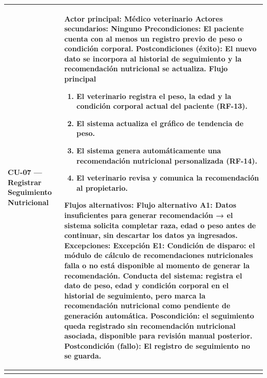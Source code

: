 \documentclass[
]{article}
\newcounter{none} %
\begin{document}
{\def\LTcaptype{none} %
\begin{longtable}[]{|
  >{\raggedright\arraybackslash}p{}|
  >{\raggedright\arraybackslash}p{}|}
\hline
\begin{minipage}[b]{\linewidth}\raggedright
\textbf{CU-07 --- Registrar Seguimiento Nutricional}
\end{minipage} & \begin{minipage}[b]{\linewidth}\raggedright
\textbf{Actor principal:} Médico veterinario \textbf{Actores
secundarios:} Ninguno \textbf{Precondiciones:} El paciente cuenta con al
menos un registro previo de peso o condición corporal. \textbf{Postcondiciones (éxito):} El nuevo dato se incorpora al
historial de seguimiento y la recomendación nutricional se actualiza. \textbf{Flujo principal}

\begin{enumerate}
\def\labelenumi{\arabic{enumi}.}
\item
  El veterinario registra el peso, la edad y la condición corporal
  actual del paciente (RF-13).
\item
  El sistema actualiza el gráfico de tendencia de peso.
\item
  El sistema genera automáticamente una recomendación nutricional
  personalizada (RF-14).
\item
  El veterinario revisa y comunica la recomendación al propietario.
\end{enumerate}

\textbf{Flujos alternativos:} Flujo alternativo A1: Datos insuficientes para generar recomendación → el sistema solicita completar raza, edad o peso antes de continuar, sin descartar los datos ya ingresados.
\textbf{Excepciones:} Excepción E1: Condición de disparo: el módulo de cálculo de recomendaciones nutricionales falla o no está disponible al momento de generar la recomendación. Conducta del sistema: registra el dato de peso, edad y condición corporal en el historial de seguimiento, pero marca la recomendación nutricional como pendiente de generación automática. Poscondición: el seguimiento queda registrado sin recomendación nutricional asociada, disponible para revisión manual posterior.
\textbf{Postcondición (fallo):} El registro de seguimiento no se guarda.
\end{minipage} \\
\hline
\endhead
\hline
\endlastfoot
\end{longtable}
}
\end{document}

